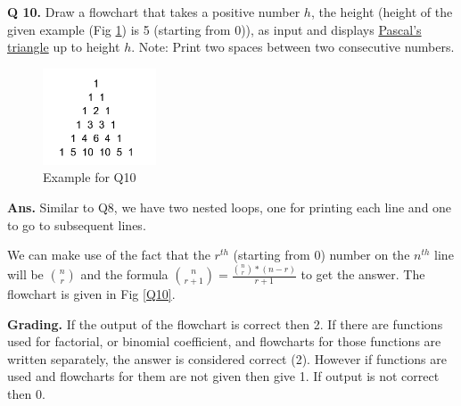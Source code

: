 \documentclass{article}
\begin{document}
    \clearpage

    
\begin{flushleft}

    \textbf{Q 10. } Draw a flowchart that takes a positive number $h$, 
    the height (height of the given example (Fig \ref{Q10_fig}) is 5 (starting 
    from 0)), as input and displays 
    \href{https://en.wikipedia.org/wiki/Pascal%27s_triangle}{Pascal's triangle} 
    up to height $h$.
    Note: Print two spaces between two consecutive numbers.

    \begin{figure}[ht]
        \centering
        \includegraphics[width=0.3\textwidth]{Q10_fig.png}
        \caption{Example for Q10}
        \label{Q10_fig}
    \end{figure}
    
    
    \end{flushleft}
    
    \begin{flushleft}
    
    \textbf{Ans. } Similar to Q8, we have two nested loops, one for printing 
    each line and one to go to subsequent lines.

    We can make use of the fact that the $r^{th}$ (starting from $0$) number 
    on the $n^{th}$ line will be $\binom{n}{r}$ and the formula 
    $\binom{n}{r+1} = \frac{\binom{n}{r} * (n-r)}{r+1}$ to get the 
    answer. The flowchart is given in Fig \ref{Q10}.

    
    \end{flushleft}
    
    \begin{flushleft}
    
    \textbf{Grading. } If the output of the flowchart is correct then 2. 
    If there are functions used for factorial, or binomial coefficient, and 
    flowcharts for those functions are written separately, the answer is 
    considered correct (2). However if functions are used and flowcharts for them 
    are not given then give 1. If output is not correct then 0.
    
    \end{flushleft}
    
\end{document}
